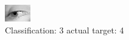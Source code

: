 \begin{figure}[h!]
\begin{center}
\includegraphics[width=0.60\columnwidth]{figures/ID3063_class_3_target_4.png}
\end{center}
\caption{ Classification: 3 actual target: 4}
\label{fig:ID3063_class_3_target_4}
\end{figure}
